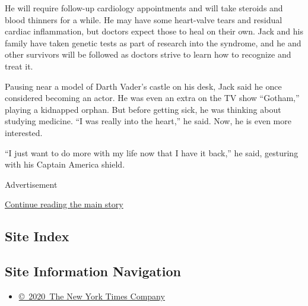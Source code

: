 He will require follow-up cardiology appointments and will take steroids
and blood thinners for a while. He may have some heart-valve tears and
residual cardiac inflammation, but doctors expect those to heal on their
own. Jack and his family have taken genetic tests as part of research
into the syndrome, and he and other survivors will be followed as
doctors strive to learn how to recognize and treat it.

Pausing near a model of Darth Vader's castle on his desk, Jack said he
once considered becoming an actor. He was even an extra on the TV show
``Gotham,'' playing a kidnapped orphan. But before getting sick, he was
thinking about studying medicine. ``I was really into the heart,'' he
said. Now, he is even more interested.

``I just want to do more with my life now that I have it back,'' he
said, gesturing with his Captain America shield.

Advertisement

\protect\hyperlink{after-bottom}{Continue reading the main story}

\hypertarget{site-index}{%
\subsection{Site Index}\label{site-index}}

\hypertarget{site-information-navigation}{%
\subsection{Site Information
Navigation}\label{site-information-navigation}}

\begin{itemize}
\tightlist
\item
  \href{https://help.nytimes.com/hc/en-us/articles/115014792127-Copyright-notice}{©~2020~The
  New York Times Company}
\end{itemize}

